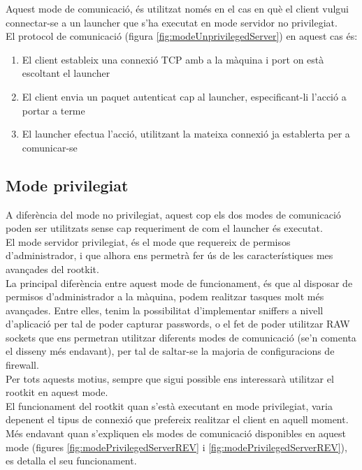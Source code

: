 Aquest mode de comunicació, és utilitzat només en el cas en què el client vulgui connectar-se a un launcher que
s'ha executat en mode servidor no privilegiat. \\

El protocol de comunicació (figura \ref{fig:modeUnprivilegedServer}) en aquest cas és: \\

\begin{enumerate}
    \item El client estableix una connexió TCP amb a la màquina i port on està escoltant el launcher
    \item El client envia un paquet autenticat cap al launcher, especificant-li l'acció a portar a terme
    \item El launcher efectua l'acció, utilitzant la mateixa connexió ja establerta per a comunicar-se
\end{enumerate}

\subsection{Mode privilegiat}

A diferència del mode no privilegiat, aquest cop els dos modes de comunicació poden ser utilitzats sense cap requeriment de com
el launcher és executat. \\


El mode servidor privilegiat, és el mode que requereix de permisos d'administrador, i que alhora ens permetrà
fer ús de les característiques mes avançades del rootkit. \\

La principal diferència entre aquest mode de funcionament, és que al disposar de permisos d'administrador a
la màquina, podem realitzar tasques molt més avançades. Entre elles, tenim la possibilitat d'implementar 
sniffers a nivell d'aplicació per tal de poder capturar passwords, o el fet de poder utilitzar RAW sockets que
ens permetran utilitzar diferents modes de comunicació (se'n comenta el disseny més endavant), per tal de 
saltar-se la majoria de configuracions de firewall. \\

Per tots aquests motius, sempre que sigui possible ens interessarà utilitzar el rootkit en aquest mode. \\

El funcionament del rootkit quan s'està executant en mode privilegiat, varia depenent el tipus de connexió
que prefereix realitzar el client en aquell moment. Més endavant quan s'expliquen els modes de comunicació disponibles
en aquest mode (figures \ref{fig:modePrivilegedServerREV} i \ref{fig:modePrivilegedServerREV}), es detalla el seu funcionament. \\



